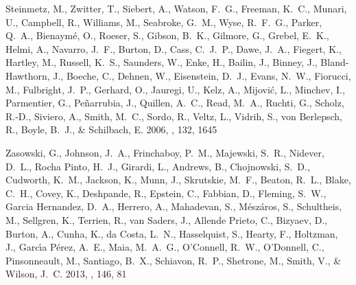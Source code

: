 \documentclass[12pt, preprint]{aastex}
\begin{document}
\begin{thebibliography}{23}
{Steinmetz}, M., {Zwitter}, T., {Siebert}, A., {Watson}, F.~G., {Freeman},
  K.~C., {Munari}, U., {Campbell}, R., {Williams}, M., {Seabroke}, G.~M.,
  {Wyse}, R.~F.~G., {Parker}, Q.~A., {Bienaym{\'e}}, O., {Roeser}, S.,
  {Gibson}, B.~K., {Gilmore}, G., {Grebel}, E.~K., {Helmi}, A., {Navarro},
  J.~F., {Burton}, D., {Cass}, C.~J.~P., {Dawe}, J.~A., {Fiegert}, K.,
  {Hartley}, M., {Russell}, K.~S., {Saunders}, W., {Enke}, H., {Bailin}, J.,
  {Binney}, J., {Bland-Hawthorn}, J., {Boeche}, C., {Dehnen}, W., {Eisenstein},
  D.~J., {Evans}, N.~W., {Fiorucci}, M., {Fulbright}, J.~P., {Gerhard}, O.,
  {Jauregi}, U., {Kelz}, A., {Mijovi{\'c}}, L., {Minchev}, I., {Parmentier},
  G., {Pe{\~n}arrubia}, J., {Quillen}, A.~C., {Read}, M.~A., {Ruchti}, G.,
  {Scholz}, R.-D., {Siviero}, A., {Smith}, M.~C., {Sordo}, R., {Veltz}, L.,
  {Vidrih}, S., {von Berlepsch}, R., {Boyle}, B.~J., \& {Schilbach}, E. 2006,
  \aj, 132, 1645

{Zasowski}, G., {Johnson}, J.~A., {Frinchaboy}, P.~M., {Majewski}, S.~R.,
  {Nidever}, D.~L., {Rocha Pinto}, H.~J., {Girardi}, L., {Andrews}, B.,
  {Chojnowski}, S.~D., {Cudworth}, K.~M., {Jackson}, K., {Munn}, J.,
  {Skrutskie}, M.~F., {Beaton}, R.~L., {Blake}, C.~H., {Covey}, K.,
  {Deshpande}, R., {Epstein}, C., {Fabbian}, D., {Fleming}, S.~W., {Garcia
  Hernandez}, D.~A., {Herrero}, A., {Mahadevan}, S., {M{\'e}sz{\'a}ros}, S.,
  {Schultheis}, M., {Sellgren}, K., {Terrien}, R., {van Saders}, J., {Allende
  Prieto}, C., {Bizyaev}, D., {Burton}, A., {Cunha}, K., {da Costa}, L.~N.,
  {Hasselquist}, S., {Hearty}, F., {Holtzman}, J., {Garc{\'{\i}}a P{\'e}rez},
  A.~E., {Maia}, M.~A.~G., {O'Connell}, R.~W., {O'Donnell}, C., {Pinsonneault},
  M., {Santiago}, B.~X., {Schiavon}, R.~P., {Shetrone}, M., {Smith}, V., \&
  {Wilson}, J.~C. 2013, \aj, 146, 81

\end{thebibliography}

%
\end{document}
